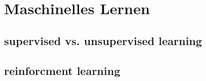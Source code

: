 \section{Maschinelles Lernen} \label{chpt:Stand_der_Technik_Maschinelles_Lernen}

\subsection{supervised vs. unsupervised learning}
\subsection{reinforcment learning}